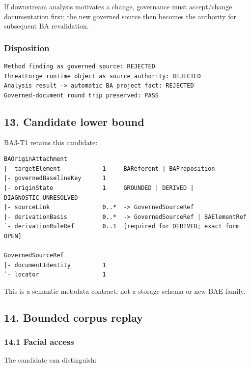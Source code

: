 \documentclass[11pt,a4paper]{article}
\begin{document}
If downstream analysis motivates a change, governance must accept/change documentation first; the new governed source then becomes the authority for subsequent BA revalidation.

\subsubsection{Disposition}\label{disposition-9}

\begin{verbatim}
Method finding as governed source: REJECTED
ThreatForge runtime object as source authority: REJECTED
Analysis result -> automatic BA project fact: REJECTED
Governed-document round trip preserved: PASS
\end{verbatim}

\subsection{13. Candidate lower bound}\label{13-candidate-lower-bound}

BA3-T1 retains this candidate:

\begin{verbatim}
BAOriginAttachment
|- targetElement            1     BAReferent | BAProposition
|- governedBaselineKey      1
|- originState              1     GROUNDED | DERIVED | DIAGNOSTIC_UNRESOLVED
|- sourceLink               0..*  -> GovernedSourceRef
|- derivationBasis          0..*  -> GovernedSourceRef | BAElementRef
`- derivationRuleRef        0..1  [required for DERIVED; exact form OPEN]

GovernedSourceRef
|- documentIdentity         1
`- locator                  1
\end{verbatim}

This is a semantic metadata contract, not a storage schema or new BAE family.

\subsection{14. Bounded corpus replay}\label{14-bounded-corpus-replay}

\subsubsection{14.1 Facial access}\label{141-facial-access}

The candidate can distinguish:
\end{document}
